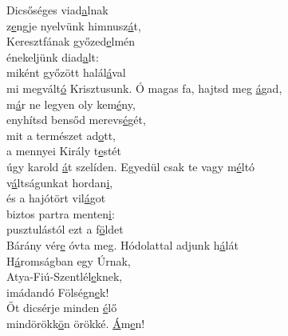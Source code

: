 \documentclass[twoside]{article}
\begin{document}
\begin{hymnstanzas}
  Dicsőséges viad\underline{a}lnak\\
  z\underline{e}ngje nyelvünk himnusz\underline{á}t,\\
  Keresztfának győzed\underline{e}lmén\\
  énekeljünk diad\underline{a}lt:\\
  miként győzött halál\underline{á}val\\
  mi megvált\underline{ó} Krisztusunk.
\stanzabreak
  Ó magas fa, hajtsd meg \underline{á}gad,\\
  m\underline{á}r ne legyen oly kem\underline{é}ny,\\
  enyhítsd bensőd merevs\underline{é}gét,\\
  mit a természet ad\underline{o}tt,\\
  a mennyei Király t\underline{e}stét\\
  úgy karold \underline{á}t szelíden.
\stanzabreak
  Egyedül csak te vagy m\underline{é}ltó\\
  v\underline{á}ltságunkat hordan\underline{i},\\
  és a hajótört vil\underline{á}got\\
  biztos partra menten\underline{i}:\\
  pusztulástól ezt a f\underline{ö}ldet\\
  Bárány vér\underline{e} óvta meg.
\stanzabreak
  Hódolattal adjunk h\underline{á}lát\\
  H\underline{á}romságban egy Úrn{a}k,\\
  Atya-Fiú-Szentlél\underline{e}knek,\\
  imádandó Fölségn\underline{e}k!\\
  Őt dicsérje minden \underline{é}lő\\
  mindörökk\underline{ö}n örökké. \underline{Á}m\underline{e}n!
\end{hymnstanzas}

\end{document}
